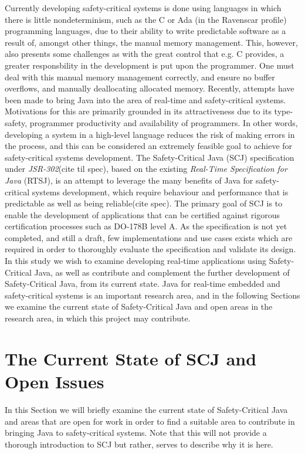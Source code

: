 Currently developing safety-critical systems is done using languages in which there is little nondeterminism, such as the C or Ada (in the Ravenscar profile) programming languages, due to their ability to write predictable software as a result of, amongst other things, the manual memory management. This, however, also presents some challenges as with the great control that e.g. C provides, a greater responsbility in the development is put upon the programmer. One must deal with this manual memory management correctly, and ensure no buffer overflows, and manually deallocating allocated memory.
Recently, attempts have been made to bring Java into the area of real-time and safety-critical systems. Motivations for this are primarily grounded in its attractiveness due to its type-safety, programmer productivity and availability of programmers. In other words, developing a system in a high-level language reduces the risk of making errors in the process, and this can be considered an extremely feasible goal to achieve for safety-critical systems development.
The Safety-Critical Java (SCJ) specification under \textit{JSR-302}\cite{JSR}(cite til spec), based on the existing \textit{Real-Time Specification for Java} (RTSJ), is an attempt to leverage the many benefits of Java for safety-critical systems development, which require behaviour and performance that is predictable as well as being reliable(cite spec). The primary goal of SCJ is to enable the development of applications that can be certified against rigorous certification processes such as DO-178B level A. As the specification is not yet completed, and still a draft, few implementations and use cases exists which are required in order to thoroughly evaluate the specification and validate its design.
In this study we wish to examine developing real-time applications using Safety-Critical Java, as well as contribute and complement the further development of Safety-Critical Java, from its current state. Java for real-time embedded and safety-critical systems is an important research area, and in the following Sections we examine the current state of Safety-Critical Java and open areas in the research area, in which this project may contribute.

\section{The Current State of SCJ and Open Issues}
In this Section we will briefly examine the current state of Safety-Critical Java and areas that are open for work in order to find a suitable area to contribute in bringing Java to safety-critical systems. Note that this will not provide a thorough introduction to SCJ but rather, serves to describe why it is here.

